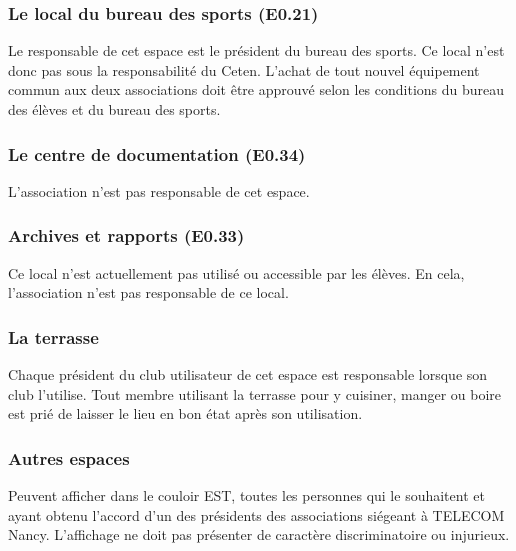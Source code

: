 \documentclass{article} %
\begin{document}
			\subsubsection{Le local du bureau des sports (E0.21)}
\label{ssub:le_local_bureau_des_sports_e0_21_}

				Le responsable de cet espace est le président du bureau des
				sports. Ce local n’est donc pas sous la responsabilité du
				Ceten. L’achat de tout nouvel équipement commun aux deux
				associations doit être approuvé selon les conditions du bureau
				des élèves et du bureau des sports.

			\subsubsection{Le centre de documentation (E0.34)}
\label{ssub:le_centre_de_documentation_e0_34_}

				L’association n’est pas responsable de cet espace.

			\subsubsection{Archives et rapports (E0.33)}
\label{ssub:archives_et_rapports_e0_33_}

				Ce local n’est actuellement pas utilisé ou accessible par les
				élèves. En cela, l’association n’est pas responsable de ce
				local.

			\subsubsection{La terrasse}
\label{ssub:la_terrasse}

				Chaque président du club utilisateur de cet espace est
				responsable lorsque son club l’utilise. Tout membre utilisant
				la terrasse pour y cuisiner, manger ou boire est prié de
				laisser le lieu en bon état après son utilisation.

			\subsubsection{Autres espaces}
\label{ssub:autres_espaces}

				Peuvent afficher dans le couloir EST\@, toutes les personnes qui
				le souhaitent et ayant obtenu l’accord d’un des présidents des
				associations siégeant à TELECOM Nancy. L’affichage ne doit pas
				présenter de caractère discriminatoire ou injurieux.
\end{document}
